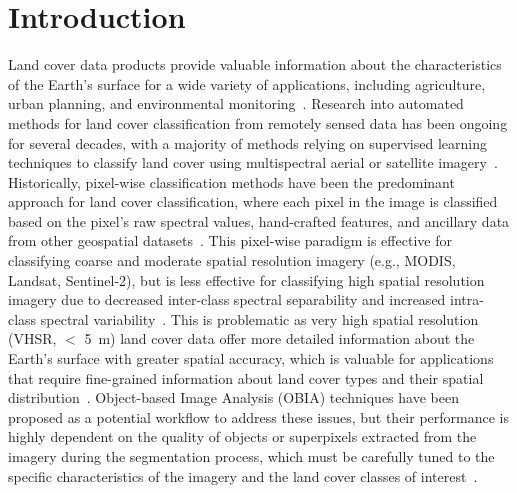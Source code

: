 \section{Introduction}

Land cover data products provide valuable information about the characteristics of the Earth's surface for a wide variety of applications, including agriculture, urban planning, and environmental monitoring~\citep{scarpace1980land, lovelandDevelopmentGlobalLand2000,townshendLandCover1992,wulderLandCover2018,banGlobalLandCover2015}.
Research into automated methods for land cover classification from remotely sensed data has been ongoing for several decades, with a majority of methods relying on supervised learning techniques to classify land cover using multispectral aerial or satellite imagery~\citep{phiriDevelopmentsLandsatLand2017, maxwellImplementationMachinelearningClassification2018}.
Historically, pixel-wise classification methods have been the predominant approach for land cover classification, where each pixel in the image is classified based on the pixel's raw spectral values, hand-crafted features, and ancillary data from other geospatial datasets~\citep{mciverEstimatingPixelscaleLand2001, khatamiMetaanalysisRemoteSensing2016}.
This pixel-wise paradigm is effective for classifying coarse and moderate spatial resolution imagery (e.g., MODIS, Landsat, Sentinel-2), but is less effective for classifying high spatial resolution imagery due to decreased inter-class spectral separability and increased intra-class spectral variability~\citep{strahlerNatureModelsRemote1986,woodcockFactorScaleRemote1987,hansenReviewLargeArea2012, grekousisOverview21Global2015, markhamLandCoverClassification1981, luSurveyImageClassification2007}.
This is problematic as very high spatial resolution (VHSR, \(<\) \SI{5}{\meter}) land cover data offer more detailed information about the Earth's surface with greater spatial accuracy, which is valuable for applications that require fine-grained information about land cover types and their spatial distribution~\citep{liImpactsSpatialResolutions2022,fisherImpactSatelliteImagery2018}.
Object-based Image Analysis (OBIA) techniques have been proposed as a potential workflow to address these issues, but their performance is highly dependent on the quality of objects or superpixels extracted from the imagery during the segmentation process, which must be carefully tuned to the specific characteristics of the imagery and the land cover classes of interest~\citep{blaschkeGeographicObjectBasedImage2014a, johnsonUnsupervisedImageSegmentation2011, maReviewSupervisedObjectbased2017}.
